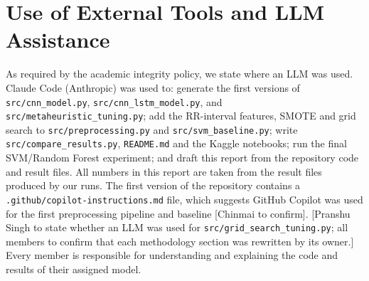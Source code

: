 \documentclass[11pt,a4paper]{article}
\begin{document}
\section*{Use of External Tools and LLM Assistance}
As required by the academic integrity policy, we state where an LLM was used. Claude Code (Anthropic) was used to: generate the first versions of \texttt{src/cnn\_model.py}, \texttt{src/cnn\_lstm\_model.py}, and \texttt{src/metaheuristic\_tuning.py}; add the RR-interval features, SMOTE and grid search to \texttt{src/preprocessing.py} and \texttt{src/svm\_baseline.py}; write \texttt{src/compare\_results.py}, \texttt{README.md} and the Kaggle notebooks; run the final SVM/Random Forest experiment; and draft this report from the repository code and result files. All numbers in this report are taken from the result files produced by our runs. The first version of the repository contains a \texttt{.github/copilot-instructions.md} file, which suggests GitHub Copilot was used for the first preprocessing pipeline and baseline [Chinmai to confirm]. [Pranshu Singh to state whether an LLM was used for \texttt{src/grid\_search\_tuning.py}; all members to confirm that each methodology section was rewritten by its owner.] Every member is responsible for understanding and explaining the code and results of their assigned model.
\end{document}
